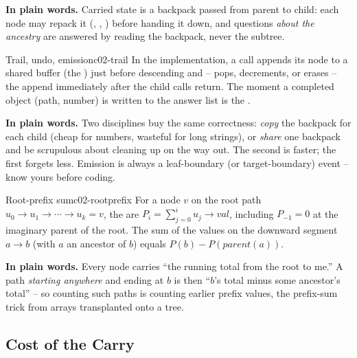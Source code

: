 \noindent\textbf{In plain words.} Carried state is a backpack passed from parent
to child: each node may repack it (, ,
) before handing it down, and questions \emph{about the ancestry}
are answered by reading the backpack, never the subtree.

\begin{definition}{Trail, undo, emission}{c02-trail}
In the  implementation, a call appends its node to a shared
buffer (the ) just before descending and  -- pops,
decrements, or erases -- the append immediately after the child calls return. The
moment a completed object (path, number) is written to the answer list is the
.
\end{definition}

\noindent\textbf{In plain words.} Two disciplines buy the same correctness:
\emph{copy} the backpack for each child (cheap for numbers, wasteful for long
strings), or \emph{share} one backpack and be scrupulous about cleaning up on the
way out. The second is faster; the first forgets less. Emission is always a
leaf-boundary (or target-boundary) event -- know yours before coding.

\begin{definition}{Root-prefix sum}{c02-rootprefix}
For a node $v$ on the root path $u_0 \to u_1 \to \cdots \to u_k = v$, the
 are $P_i = \sum_{j=0}^{i} u_j\to\mathit{val}$, including
$P_{-1} = 0$ at the imaginary parent of the root. The sum of the values on the
downward segment $a \to b$ (with $a$ an ancestor of $b$) equals
$P(b) - P(\mathit{parent}(a))$.
\end{definition}

\noindent\textbf{In plain words.} Every node carries ``the running total from the
root to me.'' A path \emph{starting anywhere} and ending at $b$ is then
``$b$'s total minus some ancestor's total'' -- so counting such paths is counting
earlier prefix values, the prefix-sum trick from arrays transplanted onto a tree.

\subsection{Cost of the Carry}

